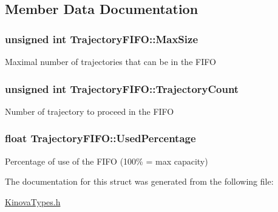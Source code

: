\subsection{Member Data Documentation}
\hypertarget{struct_trajectory_f_i_f_o_ab57ade5bd66a71bfede38fb4d300d1d7}{
\subsubsection[{Max\-Size}]{\setlength{\rightskip}{0pt plus 5cm}unsigned int Trajectory\-F\-I\-F\-O\-::\-Max\-Size}}\label{struct_trajectory_f_i_f_o_ab57ade5bd66a71bfede38fb4d300d1d7}
Maximal number of trajectories that can be in the F\-I\-F\-O \hypertarget{struct_trajectory_f_i_f_o_a8d2d82f71459128dd803eb7c9e09c2c6}{
\subsubsection[{Trajectory\-Count}]{\setlength{\rightskip}{0pt plus 5cm}unsigned int Trajectory\-F\-I\-F\-O\-::\-Trajectory\-Count}}\label{struct_trajectory_f_i_f_o_a8d2d82f71459128dd803eb7c9e09c2c6}
Number of trajectory to proceed in the F\-I\-F\-O \hypertarget{struct_trajectory_f_i_f_o_aa522f62f9f815f31be1d03c0b89653f5}{
\subsubsection[{Used\-Percentage}]{\setlength{\rightskip}{0pt plus 5cm}float Trajectory\-F\-I\-F\-O\-::\-Used\-Percentage}}\label{struct_trajectory_f_i_f_o_aa522f62f9f815f31be1d03c0b89653f5}
Percentage of use of the F\-I\-F\-O (100\% = max capacity) 

The documentation for this struct was generated from the following file\-:\begin{DoxyCompactItemize}
\item 
\hyperlink{_kinova_types_8h}{Kinova\-Types.\-h}\end{DoxyCompactItemize}
